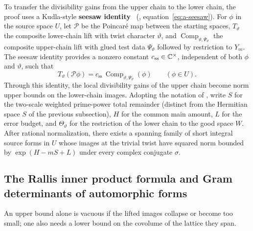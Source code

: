 To transfer the divisibility gains from the upper chain to the lower chain, the proof uses a Kudla-style \textbf{seesaw identity}~\cite{Kudla1984} (, equation~\eqref{eq:a-seesaw}). For $\phi$ in the source space $U$, let $\mathcal P$ be the Poincaré map between the starting spaces, $T_\vartheta$ the composite lower-chain lift with twist character $\vartheta$, and $\operatorname{Comp}_{\vartheta,\Psi_\vartheta}$ the composite upper-chain lift with glued test data $\Psi_\vartheta$ followed by restriction to $Y_m$. The seesaw identity provides a nonzero constant $c_{\mathrm{ss}}\in\mathbb{C}^\times$, independent of both $\phi$ and $\vartheta$, such that
\[
T_\vartheta(\mathcal P\phi)=c_{\mathrm{ss}}\,\operatorname{Comp}_{\vartheta,\Psi_\vartheta}(\phi)
\qquad (\phi\in U).
\]
Through this identity, the local divisibility gains of the upper chain become norm upper bounds on the lower-chain images. Adopting the notation of , write $S$ for the two-scale weighted prime-power total remainder (distinct from the Hermitian space $S$ of the previous subsection), $H$ for the common main amount, $L$ for the error budget, and $\Theta_\vartheta$ for the restriction of the lower chain to the good space $W$. After rational normalization, there exists a spanning family of short integral source forms in $U$ whose images at the trivial twist have squared norm bounded by $\exp(H-mS+L)$ under every complex conjugate $\sigma$.

\subsection[Rallis inner product and Gram determinants]{The Rallis inner product formula and Gram determinants of automorphic forms}

An upper bound alone is vacuous if the lifted images collapse or become too small; one also needs a lower bound on the covolume of the lattice they span.

